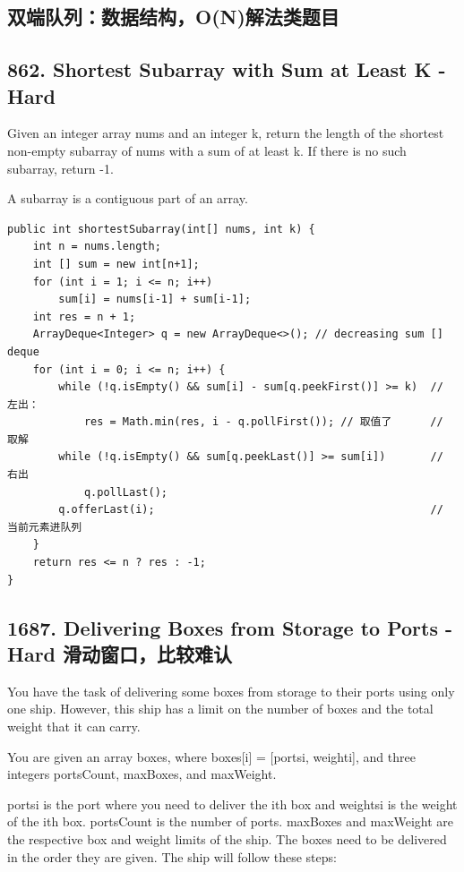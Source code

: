 \documentclass[9pt, b5paaper]{book}
\begin{document}
\subsection{双端队列：数据结构，O(N)解法类题目}
\label{sec-5-0-12}
\subsection{862. Shortest Subarray with Sum at Least K - Hard}
\label{sec-5-0-13}
Given an integer array nums and an integer k, return the length of the shortest non-empty subarray of nums with a sum of at least k. If there is no such subarray, return -1.

A subarray is a contiguous part of an array.
\begin{verbatim}
public int shortestSubarray(int[] nums, int k) { 
    int n = nums.length;
    int [] sum = new int[n+1];  
    for (int i = 1; i <= n; i++)  
        sum[i] = nums[i-1] + sum[i-1];
    int res = n + 1;
    ArrayDeque<Integer> q = new ArrayDeque<>(); // decreasing sum [] deque
    for (int i = 0; i <= n; i++) {
        while (!q.isEmpty() && sum[i] - sum[q.peekFirst()] >= k)  // 左出：
            res = Math.min(res, i - q.pollFirst()); // 取值了      // 取解
        while (!q.isEmpty() && sum[q.peekLast()] >= sum[i])       // 右出
            q.pollLast();  
        q.offerLast(i);                                           // 当前元素进队列
    }
    return res <= n ? res : -1;
}
\end{verbatim}

\subsection{1687. Delivering Boxes from Storage to Ports - Hard 滑动窗口，比较难认}
\label{sec-5-0-14}
You have the task of delivering some boxes from storage to their ports using only one ship. However, this ship has a limit on the number of boxes and the total weight that it can carry.

You are given an array boxes, where boxes[i] = [ports​​i​, weighti], and three integers portsCount, maxBoxes, and maxWeight.

ports​​i is the port where you need to deliver the ith box and weightsi is the weight of the ith box.
portsCount is the number of ports.
maxBoxes and maxWeight are the respective box and weight limits of the ship.
The boxes need to be delivered in the order they are given. The ship will follow these steps:
\end{document}

